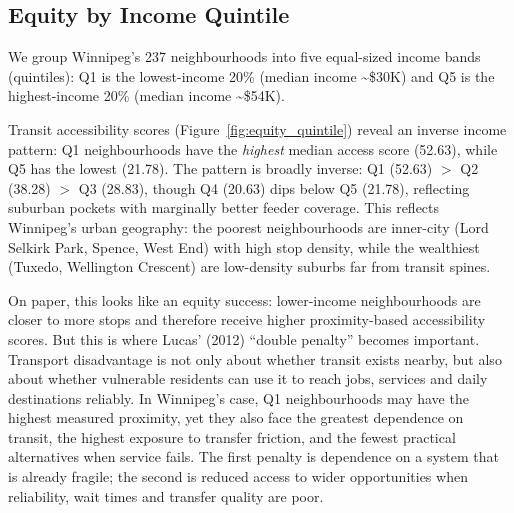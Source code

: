 \documentclass[11pt]{article}
\begin{document}
\subsection{Equity by Income Quintile}

We group Winnipeg's 237 neighbourhoods into five equal-sized income bands
(quintiles): Q1 is the lowest-income 20\% (median income \textasciitilde\$30K)
and Q5 is the highest-income 20\% (median income \textasciitilde\$54K).

Transit accessibility scores (Figure~\ref{fig:equity_quintile}) reveal an inverse income pattern: Q1 neighbourhoods have the \emph{highest} median access score (52.63), while Q5 has the lowest (21.78). The pattern is broadly inverse: Q1 (52.63) $>$ Q2 (38.28) $>$ Q3 (28.83), though Q4 (20.63) dips below Q5 (21.78), reflecting suburban pockets with marginally better feeder coverage. This reflects Winnipeg's urban geography: the poorest neighbourhoods are inner-city (Lord Selkirk Park, Spence, West End) with high stop density, while the wealthiest (Tuxedo, Wellington Crescent) are low-density suburbs far from transit spines.

On paper, this looks like an equity success: lower-income neighbourhoods are closer to more stops and therefore receive higher proximity-based accessibility scores. But this is where Lucas' (2012) ``double penalty'' becomes important. Transport disadvantage is not only about whether transit exists nearby, but also about whether vulnerable residents can use it to reach jobs, services and daily destinations reliably. In Winnipeg's case, Q1 neighbourhoods may have the highest measured proximity, yet they also face the greatest dependence on transit, the highest exposure to transfer friction, and the fewest practical alternatives when service fails. The first penalty is dependence on a system that is already fragile; the second is reduced access to wider opportunities when reliability, wait times and transfer quality are poor.
\end{document}
